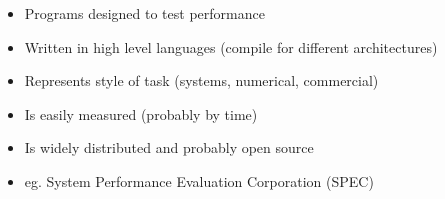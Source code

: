 \begin{itemize}
	\item Programs designed to test performance
	\item Written in high level languages (compile for different architectures)
	\item Represents style of task (systems, numerical, commercial)
	\item Is easily measured (probably by time)
	\item Is widely distributed and probably open source
	\item eg. System Performance Evaluation Corporation (SPEC)
\end{itemize}


